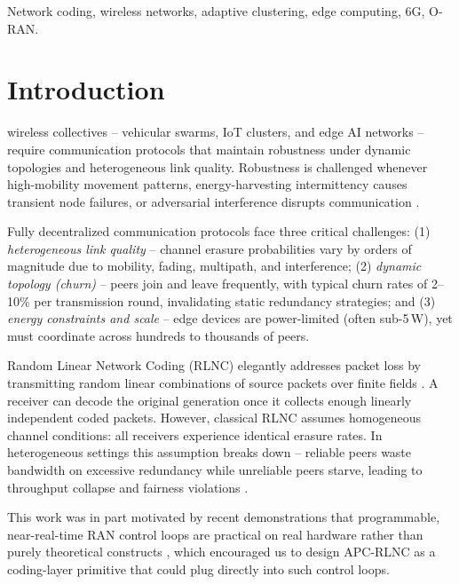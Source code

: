 \documentclass[journal]{IEEEtran}
\begin{document}
\begin{IEEEkeywords}
Network coding, wireless networks, adaptive clustering, edge computing, 6G, O-RAN.
\end{IEEEkeywords}

\section{Introduction}
 wireless collectives -- vehicular swarms, IoT clusters, and edge AI networks -- require communication protocols that maintain robustness under dynamic topologies and heterogeneous link quality. Robustness is challenged whenever high-mobility movement patterns, energy-harvesting intermittency causes transient node failures, or adversarial interference disrupts communication \cite{shi2020}.

Fully decentralized communication protocols face three critical challenges: (1) \emph{heterogeneous link quality} -- channel erasure probabilities vary by orders of magnitude due to mobility, fading, multipath, and interference; (2) \emph{dynamic topology (churn)} -- peers join and leave frequently, with typical churn rates of 2--10\% per transmission round, invalidating static redundancy strategies; and (3) \emph{energy constraints and scale} -- edge devices are power-limited (often sub-5\,W), yet must coordinate across hundreds to thousands of peers.

Random Linear Network Coding (RLNC) elegantly addresses packet loss by transmitting random linear combinations of source packets over finite fields \cite{ho2006,fragouli2007}. A receiver can decode the original generation once it collects enough linearly independent coded packets. However, classical RLNC assumes homogeneous channel conditions: all receivers experience identical erasure rates. In heterogeneous settings this assumption breaks down -- reliable peers waste bandwidth on excessive redundancy while unreliable peers starve, leading to throughput collapse and fairness violations \cite{pandi2017,dilanchian2024}.

This work was in part motivated by recent demonstrations that programmable, near-real-time RAN control loops are practical on real hardware rather than purely theoretical constructs \cite{geetha2025}, which encouraged us to design APC-RLNC as a coding-layer primitive that could plug directly into such control loops.
\end{document}
